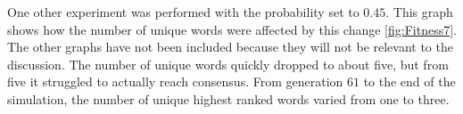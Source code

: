 One other experiment was performed with the probability set to $0.45$. This graph shows how the number of unique words were affected by this change \ref{fig:Fitness7}. The other graphs have not been included because they will not be relevant to the discussion. The number of unique words quickly dropped to about five, but from five it struggled to actually reach consensus. From generation $61$ to the end of the simulation, the number of unique highest ranked words varied from one to three.  
\begin{figure}[htbp]
    \centering
    \hfill
    \par\bigskip

\end{figure}
